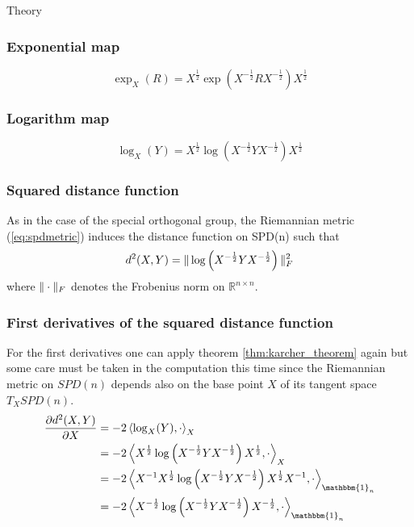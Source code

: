 \begin{chapter}{Theory}
\subsubsection{Exponential map} %
\label{ssub:ExponentialSPD}
\begin{equation}
    \exp_X(R)=X^{\frac{1}{2}}\exp\left(X^{-\frac{1}{2}}RX^{-\frac{1}{2}}\right)X^{\frac{1}{2}}
\end{equation}

\subsubsection{Logarithm map} %
\label{ssub:LogarithmSPD}
\begin{equation}
    \log_X(Y)=X^{\frac{1}{2}}\log\left(X^{-\frac{1}{2}}YX^{-\frac{1}{2}}\right)X^{\frac{1}{2}}
\end{equation}

\subsubsection{Squared distance function} %
\label{ssub:SquareddistanceSPD}
As in the case of the special orthogonal group, the Riemannian metric (\ref{eq:spdmetric}) induces the distance function on SPD(n) such that
\begin{equation}
    d^2(X,Y)=\| \log\left(X^{-\frac{1}{2}}YX^{-\frac{1}{2}}\right) \|_F^2
\end{equation}
where $\| \cdot \|_F$ denotes the Frobenius norm on $\mathbb{R}^{n\times n}$.

\subsubsection{First derivatives of the squared distance function} %
\label{ssub:First derivatives of the squared distance function}
For the first derivatives one can apply theorem \ref{thm:karcher_theorem} again but some care must be taken in the computation this time since the Riemannian metric on $SPD(n)$ depends also on the base point $X$ of its tangent space $T_XSPD(n)$.
\begin{align}
    \frac{\partial d^2(X,Y)}{\partial X} &= -2\braket{\log_X(Y),\cdot}_{X}\\
    &= -2 \braket{X^{\frac{1}{2}}\log\left(X^{-\frac{1}{2}}YX^{-\frac{1}{2}}\right)X^{\frac{1}{2}},\cdot}_{X} \\
    &= -2 \braket{X^{-1}X^{\frac{1}{2}}\log\left(X^{-\frac{1}{2}}YX^{-\frac{1}{2}}\right)X^{\frac{1}{2}}X^{-1},\cdot}_{\mathbbm{1}_n} \\
    &= -2 \braket{X^{-\frac{1}{2}}\log\left( X^{-\frac{1}{2}}YX^{-\frac{1}{2}}\right)X^{-\frac{1}{2}},\cdot}_{\mathbbm{1}_n} 
\end{align}


\end{chapter}
